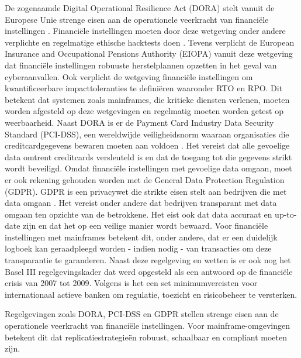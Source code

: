 De zogenaamde Digital Operational Resilience Act (DORA) stelt vanuit de Europese Unie strenge eisen aan de operationele veerkracht van financiële instellingen \autocite{eiopa_2025_digital_operational_resilience_act}. 
Financiële instellingen moeten door deze wetgeving onder andere verplichte en regelmatige ethische hacktests doen \autocite{rijksoverheid_2025_verordening}.
Tevens verplicht de European Insurance and Occupational Pensions Authority (EIOPA) vanuit deze wetgeving dat financiële instellingen robuuste herstelplannen opzetten in het geval van cyberaanvallen.
Ook verplicht de wetgeving financiële instellingen om kwantificeerbare impacttoleranties te definiëren waaronder RTO en RPO.
Dit betekent dat systemen zoals mainframes, die kritieke diensten verlenen, moeten worden afgesteld op deze wetgevingen en regelmatig moeten worden getest op weerbaarheid.
Naast DORA is er de Payment Card Industry Data Security Standard (PCI-DSS), een wereldwijde veiligheidsnorm waaraan organisaties die creditcardgegevens bewaren moeten aan voldoen \autocite{pcisecuritystandardscouncil_2024_pci}.
Het vereist dat alle gevoelige data omtrent creditcards versleuteld is en dat de toegang tot die gegevens strikt wordt beveiligd.
Omdat financiële instellingen met gevoelige data omgaan, moet er ook rekening gehouden worden met de General Data Protection Regulation (GDPR).
GDPR is een privacywet die strikte eisen stelt aan bedrijven die met data omgaan \autocite{wolford_2025_what}.
Het vereist onder andere dat bedrijven transparant met data omgaan ten opzichte van de betrokkene.
Het eist ook dat data accuraat en up-to-date zijn en dat het op een veilige manier wordt bewaard. 
Voor financiële instellingen met mainframes betekent dit, onder andere, dat er een duidelijk logboek kan geraadpleegd worden - indien nodig - van transacties om deze transparantie te garanderen.
Naast deze regelgeving en wetten is er ook nog het Basel III regelgevingskader dat werd opgesteld als een antwoord op de financiële crisis van 2007 tot 2009.
Volgens \textcite{bis_2025_basel} is het een set minimumvereisten voor internationaal actieve banken om regulatie, toezicht en risicobeheer te versterken.

Regelgevingen zoals DORA, PCI-DSS en GDPR stellen strenge eisen aan de operationele veerkracht van financiële instellingen.
Voor mainframe-omgevingen betekent dit dat replicatiestrategieën robuust, schaalbaar en compliant moeten zijn. 

\section{}%
\label{sec:mainframe-replicatie}

